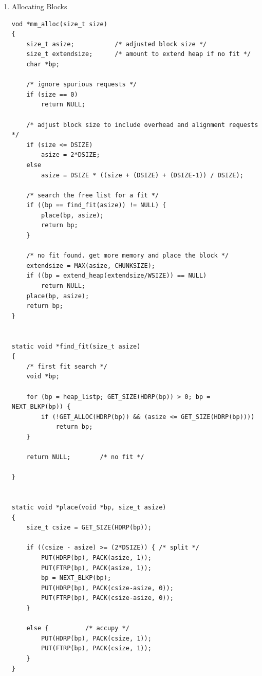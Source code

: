\documentclass[11pt]{article}
\begin{document}
\begin{enumerate}
\begin{verbatim}
  else {	 /* case 4: coalesce with the previous and the next */
    size += GET_SIZE(HDRP(PREV_BLKP(bp))) + GET_SIZE(HDRP(NEXT_BLKP(bp)));
    PUT(HDRP(PREV_BLKP(bp)), PACK(size, 0));
    PUT(FTRP(NEXT_BLKP(bp)), PACK(size, 0));
    bp = PREV_BLKP(bp);
  }

  return bp;
}

\end{verbatim}


\item Allocating Blocks
\label{sec:orgb1802f1}

\begin{verbatim}
vod *mm_alloc(size_t size)
{
    size_t asize;			/* adjusted block size */
    size_t extendsize;		/* amount to extend heap if no fit */
    char *bp;

    /* ignore spurious requests */
    if (size == 0)
        return NULL;

    /* adjust block size to include overhead and alignment requests */
    if (size <= DSIZE)
        asize = 2*DSIZE;
    else
        asize = DSIZE * ((size + (DSIZE) + (DSIZE-1)) / DSIZE);

    /* search the free list for a fit */
    if ((bp == find_fit(asize)) != NULL) {
        place(bp, asize);
        return bp;
    }

    /* no fit found. get more memory and place the block */
    extendsize = MAX(asize, CHUNKSIZE);
    if ((bp = extend_heap(extendsize/WSIZE)) == NULL)
        return NULL;
    place(bp, asize);
    return bp;
}


static void *find_fit(size_t asize)
{
    /* first fit search */
    void *bp;

    for (bp = heap_listp; GET_SIZE(HDRP(bp)) > 0; bp = NEXT_BLKP(bp)) {
        if (!GET_ALLOC(HDRP(bp)) && (asize <= GET_SIZE(HDRP(bp))))
            return bp;
    }

    return NULL;		/* no fit */

}


static void *place(void *bp, size_t asize)
{
    size_t csize = GET_SIZE(HDRP(bp));

    if ((csize - asize) >= (2*DSIZE)) { /* split */
        PUT(HDRP(bp), PACK(asize, 1));
        PUT(FTRP(bp), PACK(asize, 1));
        bp = NEXT_BLKP(bp);
        PUT(HDRP(bp), PACK(csize-asize, 0));
        PUT(FTRP(bp), PACK(csize-asize, 0));
    }

    else {			/* accupy */
        PUT(HDRP(bp), PACK(csize, 1));
        PUT(FTRP(bp), PACK(csize, 1));
    }
}

\end{verbatim}
\end{enumerate}
\end{document}

